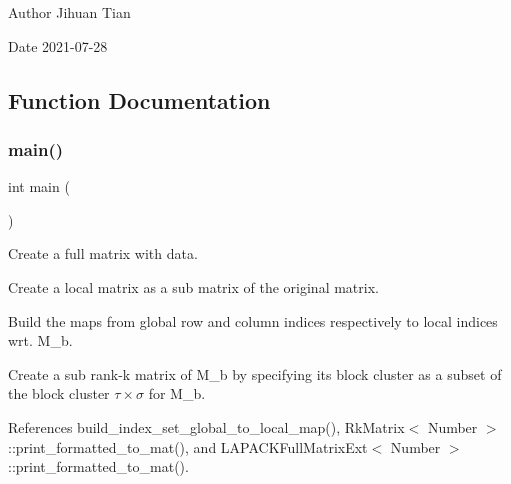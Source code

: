 \begin{DoxyAuthor}{Author}
Jihuan Tian 
\end{DoxyAuthor}
\begin{DoxyDate}{Date}
2021-\/07-\/28 
\end{DoxyDate}


\subsection{Function Documentation}
\mbox{\label{lapack-matrix-local-to-rkmatrix_8cc_ae66f6b31b5ad750f1fe042a706a4e3d4}} 
\subsubsection{\texorpdfstring{main()}{main()}}
{\footnotesize\ttfamily int main (\begin{DoxyParamCaption}{ }\end{DoxyParamCaption})}

Create a full matrix with data.

Create a local matrix as a sub matrix of the original matrix.

Build the maps from global row and column indices respectively to local indices wrt. M\+\_\+b.

Create a sub rank-\/k matrix of {\ttfamily M\+\_\+b} by specifying its block cluster as a subset of the block cluster $\tau \times \sigma$ for {\ttfamily M\+\_\+b}.

References build\+\_\+index\+\_\+set\+\_\+global\+\_\+to\+\_\+local\+\_\+map(), Rk\+Matrix$<$ Number $>$\+::print\+\_\+formatted\+\_\+to\+\_\+mat(), and L\+A\+P\+A\+C\+K\+Full\+Matrix\+Ext$<$ Number $>$\+::print\+\_\+formatted\+\_\+to\+\_\+mat().

